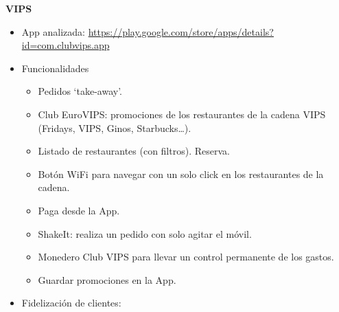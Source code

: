 \documentclass[twoside]{report}
\begin{document}
\textbf{VIPS}\\
\begin{itemize}
\item App analizada: \url{https://play.google.com/store/apps/details?id=com.clubvips.app}
\item Funcionalidades
	\begin{itemize}
	\item Pedidos ‘take-away’.
	\item Club EuroVIPS: promociones de los restaurantes de la cadena VIPS (Fridays, VIPS, Ginos, Starbucks…).
	\item Listado de restaurantes (con filtros). Reserva.
	\item Botón WiFi para navegar con un solo click en los restaurantes de la cadena.
	\item Paga desde la App.
	\item ShakeIt: realiza un pedido con solo agitar el móvil.
	\item Monedero Club VIPS para llevar un control permanente de los gastos.
	\item Guardar promociones en la App.
	\end{itemize}
\item Fidelización de clientes: 


\end{itemize}
\end{document}
